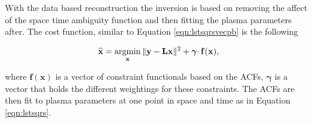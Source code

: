 With the data based reconstruction the inversion is based on removing the affect of the space time ambiguity function and then fitting the plasma parameters after. The cost function, similar to Equation \ref{eqn:lstsqrsvecpb} is the following

\begin{equation}
\label{eqn:lstsqrsvecdb}
\widehat{\mathbf{x}} = \operatorname*{\arg\!\min}\limits_{\mathbf{x}} \|\mathbf{y} -\mathbf{Lx} \|^2 + \boldsymbol{\gamma}\cdotp\mathbf{f}(\mathbf{x}),
\end{equation}

\noindent where $\mathbf{f}(\mathbf{x})$ is a vector of constraint functionals based on the ACFs, $\boldsymbol{\gamma}$ is a vector that holds the different weightings for these constraints. The ACFs are then fit to plasma parameters at one point in space and time as in Equation \ref{eqn:lstsqrs}.

%
%
%
%
%
%




%

